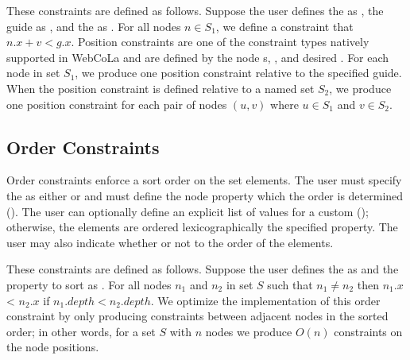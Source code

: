 These constraints are defined as follows. Suppose the user defines the
 as ,
the guide as , and the  as . 
For all nodes $n \in S_1$, we define a constraint that \mbox{$n.x + v < g.x$}.
Position constraints are one of the constraint types natively supported in
WebCoLa and are defined by the node 
s, , and desired . For each node
in set $S_1$, we produce one position constraint relative to the specified guide.
When the position constraint is defined relative to a named set $S_2$,
we produce one position constraint for each pair of nodes $(u, v)$ where $u \in S_1$ and $v \in S_2$.

\subsection{Order Constraints}
Order constraints enforce a sort order on the set elements. The user must 
specify the  as either  or  and must define
the node property  which the order is determined 
(). 
The user can optionally define an explicit list of values for a custom
 (); 
otherwise, the elements are ordered lexicographically 
the specified property. The user may also indicate whether
or not to  the order of the elements.

These constraints are defined as follows.  Suppose the user defines the  as
 and the property to sort  as . For all nodes $n_1$ 
and $n_2$ in set $S$ such that $n_1 \neq n_2$ then $n_1.x$ < $n_2.x$
if \mbox{$n_1.depth < n_2.depth$}. We optimize the implementation of this order
constraint by only producing constraints between adjacent nodes in the sorted 
order; in other words, for a set $S$ with $n$ nodes we produce $O(n)$ 
constraints on the node positions.

